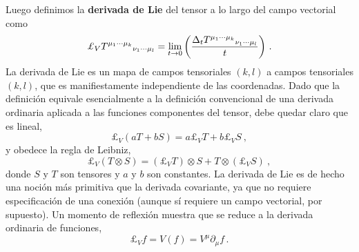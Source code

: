 \documentclass[11pt,b5paper,openany,twoside]{book}
\newcommand{\p}[1]{{\partial_{#1}}}
\def\lie{\pounds}
\begin{document}
\noindent
Luego definimos la {\bf derivada de Lie} del tensor a lo largo del campo vectorial como
\begin{equation}
\lie_VT^{\mu_1 \cdots \mu_k}{}_{\nu_1 \cdots \mu_l} =
\lim_{t\rightarrow 0}\left({{\Delta_t
T^{\mu_1 \cdots \mu_k}{}_{\nu_1 \cdots \mu_l}}\over{t}}\right)\,.
\label{5.18}
\end{equation}
La derivada de Lie es un mapa de campos tensoriales $(k,l)$ a campos tensoriales $(k,l)$, que es manifiestamente independiente de las coordenadas.
Dado que la definición equivale esencialmente a la definición convencional de una derivada ordinaria aplicada a las funciones componentes del tensor, debe quedar claro que es lineal,
\begin{equation}
\lie_V(aT+bS) = a\lie_VT + b\lie_VS\ ,\label{5.19}
\end{equation}
y obedece la regla de Leibniz,
\begin{equation}
\lie_V(T\otimes S) = (\lie_VT)\otimes S+T\otimes(\lie_VS)\ ,\label{5.20}
\end{equation}
donde $S$ y $T$ son tensores y $a$ y $b$ son constantes.
La derivada de Lie es de hecho una noción más primitiva que la derivada covariante, ya que no requiere especificación de una conexión (aunque sí requiere un campo vectorial, por supuesto).
Un momento de reflexión muestra que se reduce a la derivada ordinaria de funciones,
\begin{equation}
\lie_Vf = V(f) = V^\mu\p\mu f\,.\label{5.21}
\end{equation}
\end{document}
